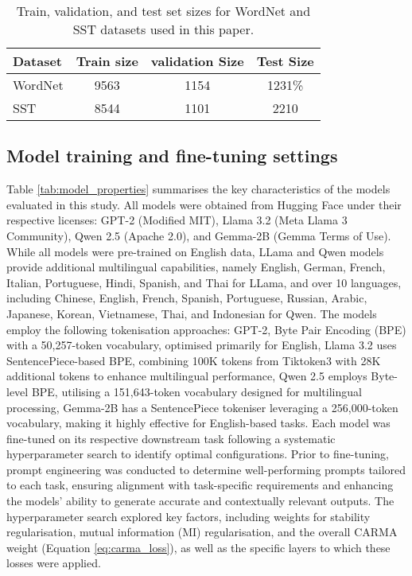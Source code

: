 \begin{table}[h]
\centering
\small
\begin{tabular}{|l|c|c|c|}
\hline
\textbf{Dataset} & \textbf{Train size} & \textbf{validation Size} & \textbf{Test Size} \\
\hline
WordNet & 9563 & 1154 & 1231\%  \\

\hline
SST & 8544 & 1101 & 2210 \\
\hline
\end{tabular}
\caption{Train, validation, and test set sizes for WordNet and SST datasets used in this paper.}
\label{tab:test_set_sizes}
\end{table}



\subsection{Model training and fine-tuning settings}\label{sec:fine_tuning_appenix}
Table \ref{tab:model_properties} summarises the key characteristics of the models evaluated in this study. All models were obtained from Hugging Face \cite{wolf2019huggingface} under their respective licenses: GPT-2 (Modified MIT), Llama 3.2 (Meta Llama 3 Community), Qwen 2.5 (Apache 2.0), and Gemma-2B (Gemma Terms of Use). While all models were pre-trained on English data, LLama and Qwen models provide additional multilingual capabilities, namely English, German, French, Italian, Portuguese, Hindi, Spanish, and Thai for LLama, and over 10 languages, including Chinese, English, French, Spanish, Portuguese, Russian, Arabic, Japanese, Korean, Vietnamese, Thai, and Indonesian for Qwen. The models employ the following tokenisation approaches: GPT-2, Byte Pair Encoding (BPE) with a 50,257-token vocabulary, optimised primarily for English, Llama 3.2 uses SentencePiece-based BPE, combining 100K tokens from Tiktoken3 with 28K additional tokens to enhance multilingual performance, Qwen 2.5 employs Byte-level BPE, utilising a 151,643-token vocabulary designed for multilingual processing, Gemma-2B has a SentencePiece tokeniser leveraging a 256,000-token vocabulary, making it highly effective for English-based tasks. Each model was fine-tuned on its respective downstream task following a systematic hyperparameter search to identify optimal configurations.
Prior to fine-tuning, prompt engineering was conducted to determine well-performing prompts tailored to each task, ensuring alignment with task-specific requirements and enhancing the models' ability to generate accurate and contextually relevant outputs. The hyperparameter search explored key factors, including weights for stability regularisation, mutual information (MI) regularisation, and the overall CARMA weight (Equation \ref{eq:carma_loss}), as well as the specific layers to which these losses were applied.

